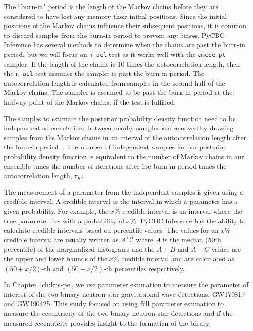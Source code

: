 The ``burn-in" period is the length of the Markov chains before they are considered to have lost any memory their initial positions. Since the initial positions of the Markov chains influence their subsequent positions, it is common to discard samples from the burn-in period to prevent any biases. PyCBC Inference has several methods to determine when the chains are past the burn-in period, but we will focus on \texttt{n\_acl} test as it works well with the \texttt{emcee\_pt} sampler. If the length of the chains is 10 times the autocorrelation length, then the \texttt{n\_acl} test assumes the sampler is past the burn-in period. The autocorrelation length is calculated from samples in the second half of the Markov chains. The sampler is assumed to be past the burn-in period at the halfway point of the Markov chains, if the test is fulfilled.

The samples to estimate the posterior probability density function need to be independent so correlations between nearby samples are removed by drawing samples from the Markov chains in an interval of the autocorrelation length after the burn-in period~\cite{Christensen:2004jm}. The number of independent samples for our posterior probability density function is equivalent to the number of Markov chains in our ensemble times the number of iterations after hte burn-in period times the autocorrelation length, $\tau_K$.

The measurement of a parameter from the independent samples is given using a credible interval. A credible interval is the interval in which a parameter has a given probability. For example, the $x\%$ credible interval is an interval where the true parameter lies with a probability of $x\%$. PyCBC Inference has the ability to calculate credible intervals based on percentile values. The values for an $x\%$ credible interval are usually written as $A^{+B}_{-C}$ where $A$ is the median (50th percentile) of the marginalized histograms and the $A+B$ and $A-C$ values are the upper and lower bounds of the $x\%$ credible interval and are calculated as $(50 + x/2)$-th and $(50 - x/2)$-th percentiles respectively.  

In Chapter~\ref{ch:bns-pe}, we use parameter estimation to measure the parameter of interest of the two binary neutron star gravitational-wave detections, GW170817 and GW190425. This study focused on using full parameter estimation to measure the eccentricity of the two binary neutron star detections and if the measured eccentricity provides insight to the formation of the binary.

